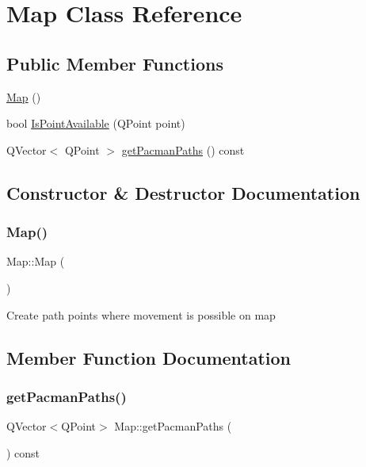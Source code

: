 \hypertarget{class_map}{}\section{Map Class Reference}
\label{class_map}
\subsection*{Public Member Functions}
\begin{DoxyCompactItemize}
\item 
\mbox{\hyperlink{class_map_a0f5ad0fd4563497b4214038cbca8b582}{Map}} ()
\item 
bool \mbox{\hyperlink{class_map_a1d4e431479ebaab122888188e12b912f}{Is\+Point\+Available}} (Q\+Point point)
\item 
Q\+Vector$<$ Q\+Point $>$ \mbox{\hyperlink{class_map_a461dfb2525afb9afbe88f1958c56ca04}{get\+Pacman\+Paths}} () const
\end{DoxyCompactItemize}


\subsection{Constructor \& Destructor Documentation}
\mbox{\label{class_map_a0f5ad0fd4563497b4214038cbca8b582}} 
\subsubsection{\texorpdfstring{Map()}{Map()}}
{\footnotesize\ttfamily Map\+::\+Map (\begin{DoxyParamCaption}{ }\end{DoxyParamCaption})}

Create path points where movement is possible on map 

\subsection{Member Function Documentation}
\mbox{\label{class_map_a461dfb2525afb9afbe88f1958c56ca04}} 
\subsubsection{\texorpdfstring{get\+Pacman\+Paths()}{getPacmanPaths()}}
{\footnotesize\ttfamily Q\+Vector$<$Q\+Point$>$ Map\+::get\+Pacman\+Paths (\begin{DoxyParamCaption}{ }\end{DoxyParamCaption}) const\hspace{0.3cm}{\ttfamily [inline]}}

